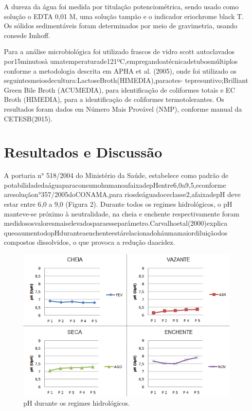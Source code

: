 \documentclass[article,12pt,onesidea,4paper,english,brazil]{abntex2}
\begin{document}
A dureza da água foi medida por titulação potenciométrica, sendo usado como solução o EDTA 0,01 M, uma solução tampão e o indicador eriochrome black T. Os sólidos sedimentáveis foram determinados por meio de gravimetria, usando conesde Imhoff.


Para a análise microbiológica foi utilizado frascos de vidro scott autoclavados por15minutosà
umatemperaturade121ºC,empregandoatécnicadetubosmúltiplos conforme a metodologia descrita em APHA et al. (2005), onde foi utilizado os seguintesmeiosdecultura:LactoseBroth(HIMEDIA),paraotes-
tepresuntivo;Brilliant Green Bile Broth (ACUMEDIA), para identificação de coliformes totais e EC Broth (HIMEDIA), para a identificação de coliformes termotolerantes. Os resultados foram dados em Número Mais Provável (NMP), conforme manual da CETESB(2015).

	
	\section*{Resultados e Discussão}
	
	
A portaria n° 518/2004 do Ministério da Saúde, estabelece como padrão de potabilidadedaáguaparaconsumohumanoafaixadepHentre6,0a9,5,econforme aresoluçãon°357/2005doCONAMA,para
riosdeáguadoceclasse2,afaixadepH deve estar entre 6,0 a 9,0 (Figura 2). Durante todos os regimes hidrológicos, o pH manteve-se próximo à neutralidade, na cheia e enchente respectivamente foram medidososvaloresmaiselevadosparaesseparâmetro.Carvalhoetal(2000)explica queoaumentodopHduranteaenchenteestárelacionadoháumamaiordiluiçãodos compostos dissolvidos, o que provoca a redução daacidez.

	\begin{figure}[!h]
	\centering
	\includegraphics[width=.8\linewidth]{pip-137-02}
	\caption{pH durante os regimes hidrológicos.}
\end{figure}
\end{document}

